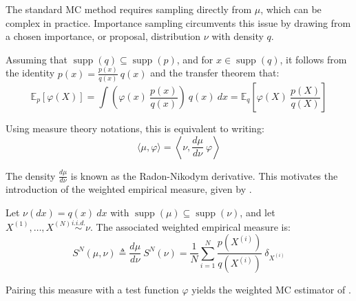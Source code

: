 The standard MC method requires sampling directly from $\mu$, which can be complex in practice. Importance sampling circumvents this issue by drawing from a chosen importance, or proposal, distribution $\nu$ with density $q$.

Assuming that $\operatorname{supp}(q)\subseteq\operatorname{supp}(p)$, and for $x\in\operatorname{supp}(q)$, it follows from the identity $p(x)=\frac{p(x)}{q(x)}\:q(x)$ and the transfer theorem that:
\begin{equation}
	\mathbb{E}_p[\varphi(X)]=\int{\left(\varphi(x)\:\frac{p(x)}{q(x)}\right)\:q(x)\:dx}=\mathbb{E}_q\left[\varphi(X)\:\frac{p(X)}{q(X)}\right]
\end{equation}

Using measure theory notations, this is equivalent to writing:
\begin{equation}
	\langle\mu,\varphi\rangle=\left\langle\nu,\frac{d\mu}{d\nu}\:\varphi\right\rangle
\end{equation}

The density $\frac{d\mu}{d\nu}$ is known as the Radon-Nikodym derivative. This motivates the introduction of the weighted empirical measure, given by .

\begin{definition}\label{th:weighted_empirical}
	Let $\nu(dx)=q(x)\:dx$ with $\operatorname{supp}(\mu)\subseteq\operatorname{supp}(\nu)$, and let $X^{(1)},\dots,X^{(N)}\overset{i.i.d.}{\sim}\nu$. The associated weighted empirical measure is:
	\begin{equation}
		S^N(\mu,\nu)\triangleq\frac{d\mu}{d\nu}\:S^N(\nu)=\frac{1}{N}\sum_{i=1}^N\frac{p(X^{(i)})}{q(X^{(i)})}\:\delta_{X^{(i)}}
	\end{equation}
\end{definition}

Pairing this measure with a test function $\varphi$ yields the weighted MC estimator of .

